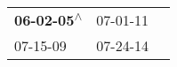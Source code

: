 \begin{supertabular}{lll}
 \textbf{06-02-05\textsuperscript{$\wedge$}} &  07-01-11\textsuperscript{} \\
                  07-15-09\textsuperscript{} &  07-24-14\textsuperscript{} \\
\end{supertabular}
